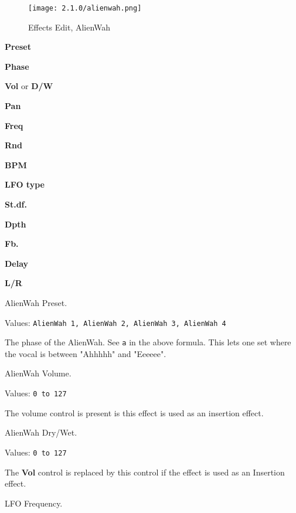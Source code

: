\begin{figure}[H]
   \centering
   \texttt{[image: 2.1.0/alienwah.png]}
   \caption{Effects Edit, AlienWah}
   \label{fig:effects_edit_alienwah}
\end{figure}

   \begin{enumber}
      \item \textbf{Preset}
      \item \textbf{Phase}
      \item \textbf{Vol} or \textbf{D/W}
      \item \textbf{Pan}
      \item \textbf{Freq}
      \item \textbf{Rnd}
      \item \textbf{BPM}
      \item \textbf{LFO type}
      \item \textbf{St.df.}
      \item \textbf{Dpth}
      \item \textbf{Fb.}
      \item \textbf{Delay}
      \item \textbf{L/R}
   \end{enumber}

   \setcounter{ItemCounter}{0}      %

   AlienWah Preset.

   Values: \texttt{AlienWah 1, AlienWah 2, AlienWah 3, AlienWah 4}

   The phase of the AlienWah.
   See \texttt{a} in the above formula.
   This lets one set where the vocal is between
   "Ahhhhh" and "Eeeeee".

   AlienWah Volume.

   Values: \texttt{0 to 127}

   The volume control is present is this effect is used as an insertion
   effect.

   AlienWah Dry/Wet.

   Values: \texttt{0 to 127}

   The \textbf{Vol} control is replaced by this control if the effect is
   used as an Insertion effect.

   LFO Frequency.

